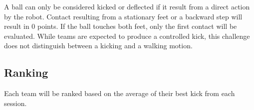  A ball can only be considered kicked or deflected if it result from a direct action by the robot.
  Contact resulting from a stationary feet or a backward step will result in 0 points.
  If the ball touches both feet, only the first contact will be evaluated.
  While teams are expected to produce a controlled kick, this challenge does not distinguish between a kicking and a walking motion.
  \subsection{Ranking}

  Each team will be ranked based on the average of their best kick from each session.